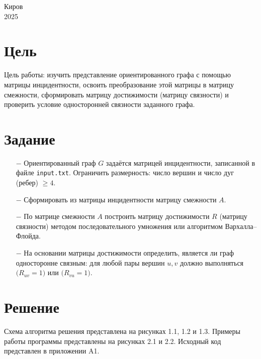\documentclass[oneside,a4paper,14pt]{extarticle}
\begin{document}
\begin{center}
	Киров\\
	2025
\end{center}

\newpage\thispagestyle{plain}

\section*{Цель}

Цель работы: изучить представление ориентированного графа с помощью матрицы инцидентности, освоить преобразование этой матрицы в матрицу смежности, сформировать матрицу достижимости (матрицу связности) и проверить условие односторонней связности заданного графа.

\section*{Задание}
\begin{itemize}
	\item[$-$] Ориентированный граф \(G\) задаётся матрицей инцидентности, записанной в файле \texttt{input.txt}. Ограничить размерность: число вершин и число дуг (ребер) \(\ge 4\).
	\item[$-$] Сформировать из матрицы инцидентности матрицу смежности \(A\).
	\item[$-$] По матрице смежности \(A\) построить матрицу достижимости \(R\) (матрицу связности) методом последовательного умножения или алгоритмом Вархалла–Флойда.
	\item[$-$] На основании матрицы достижимости определить, является ли граф односторонне связным: для любой пары вершин \(u,v\) должно выполняться \(\bigl(R_{uv}=1\bigr)\) или \(\bigl(R_{vu}=1\bigr)\).
\end{itemize}

\section*{Решение}

Схема алгоритма решения представлена на рисунках 1.1, 1.2 и 1.3. Примеры работы программы представлены на рисунках 2.1 и 2.2. Исходный код представлен в приложении A1.
\end{document}
